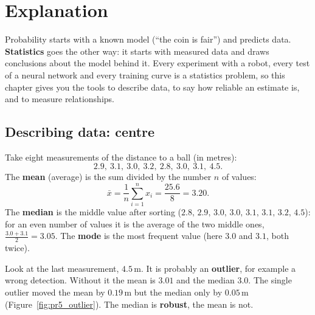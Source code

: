 \label{ch:stats}

\section*{Explanation}
Probability starts with a known model (``the coin is fair'') and predicts data. \textbf{Statistics} goes the other way: it starts with measured data and draws conclusions about the model behind it. Every experiment with a robot, every test of a neural network and every training curve is a statistics problem, so this chapter gives you the tools to describe data, to say how reliable an estimate is, and to measure relationships.

\subsection*{Describing data: centre}
Take eight measurements of the distance to a ball (in metres):
\[
2.9,\ 3.1,\ 3.0,\ 3.2,\ 2.8,\ 3.0,\ 3.1,\ 4.5.
\]
The \textbf{mean} (average) is the sum divided by the number $n$ of values:
\[
\bar x=\frac1n\sum_{i=1}^n x_i=\frac{25.6}{8}=3.20.
\]
The \textbf{median} is the middle value after sorting ($2.8,\,2.9,\,3.0,\,3.0,\,3.1,\,3.1,\,3.2,\,4.5$): for an even number of values it is the average of the two middle ones, $\frac{3.0+3.1}{2}=3.05$. The \textbf{mode} is the most frequent value (here $3.0$ and $3.1$, both twice).

Look at the last measurement, $4.5$\,m. It is probably an \textbf{outlier}, for example a wrong detection. Without it the mean is $3.01$ and the median $3.0$. The single outlier moved the mean by $0.19$\,m but the median only by $0.05$\,m (Figure~\ref{fig:pr5_outlier}). The median is \textbf{robust}, the mean is not.

\begin{center}
\label{fig:pr5_outlier}
\end{center}

